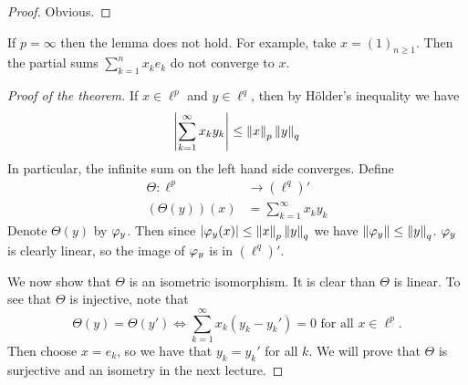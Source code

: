 \begin{proof}
  Obvious.
\end{proof}

\begin{rmk}
  If $p=\infty$ then the lemma does not hold.
  For example, take $x=(1)_{n \geq 1}$.
  Then the partial sums $\sum_{k=1}^n x_ke_k$ do not converge to $x$.
\end{rmk}

\begin{proof}[Proof of the theorem]
  If $x \in \ell^p$ and $y \in \ell^q$, then by H\"older's inequality we have
  \[\left\lvert \sum_{k=1}^\infty x_ky_k \right\rvert \leq \left\lVert x \right\rVert_p\left\lVert y \right\rVert_q\]
  In particular, the infinite sum on the left hand side converges.
  Define
  \begin{align*}
    \Theta: \ell^p &\to (\ell^q)' \\
  (\Theta(y))(x) &= \sum_{k=1}^\infty x_ky_k
  \end{align*}
  Denote $\Theta(y)$ by $\varphi_y$.
  Then since $\left\lvert \varphi_y(x) \right\rvert \leq \left\lVert x \right\rVert_p \left\lVert y \right\rVert_q$ we have $\left\lVert \varphi_y \right\rVert \leq \left\lVert y \right\rVert_q$.
  $\varphi_y$ is clearly linear, so the image of $\varphi_y$ is in $(\ell^q)'$.

  We now show that $\Theta$ is an isometric isomorphism.
  It is clear than $\Theta$ is linear.
  To see that $\Theta$ is injective, note that
  \[\Theta(y)=\Theta(y') \iff \sum_{k=1}^\infty x_k(y_k-y_k')=0 \text{ for all } x \in \ell^p.\]
  Then choose $x = e_k$, so we have that $y_k=y_k'$ for all $k$.
  We will prove that $\Theta$ is surjective and an isometry in the next lecture.
\end{proof}
